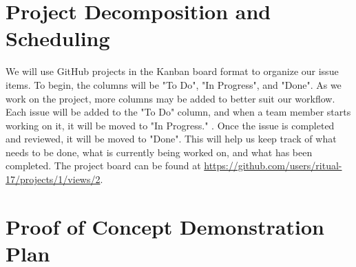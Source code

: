 \documentclass{article}
\begin{document}
{%

\section{Project Decomposition and Scheduling}

  
  We will use GitHub projects in the Kanban board format to organize our 
  issue items. To begin, the columns will be "To Do", "In Progress", 
  and "Done". As we work on the project, more columns may be added to 
  better suit our workflow. Each issue will be added to the "To Do" column,
  and when a team member starts working on it, it will be moved to "In Progress."
  . Once the issue is completed and reviewed, it will be moved to
  "Done". This will help us keep track of what needs to be done, what is 
  currently being worked on, and what has been completed. The project 
  board can be found at 
  \url{https://github.com/users/ritual-17/projects/1/views/2}.
  



\section{Proof of Concept Demonstration Plan}


}
\end{document}
